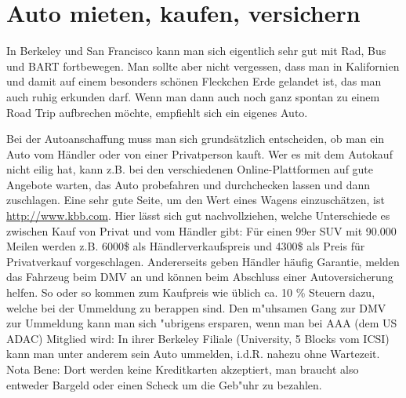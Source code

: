 \documentclass[a4paper]{scrreprt}
\begin{document}
\section{Auto mieten, kaufen, versichern}

In Berkeley und San Francisco kann man sich eigentlich sehr gut mit Rad, Bus und BART fortbewegen. 
Man sollte aber nicht vergessen, dass man in Kalifornien und damit auf einem besonders schönen Fleckchen Erde gelandet ist, das man auch ruhig erkunden darf. 
Wenn man dann auch noch ganz spontan zu einem Road Trip aufbrechen möchte, empfiehlt sich ein eigenes Auto.

Bei der Autoanschaffung muss man sich grundsätzlich entscheiden, ob man ein Auto vom Händler oder von einer Privatperson kauft. 
Wer es mit dem Autokauf nicht eilig hat, kann z.B. bei den verschiedenen Online-Plattformen auf gute Angebote warten, das Auto probefahren und durchchecken lassen und dann zuschlagen. 
Eine sehr gute Seite, um den Wert eines Wagens einzuschätzen, ist \url{http://www.kbb.com}. 
Hier lässt sich gut nachvollziehen, welche Unterschiede es zwischen Kauf von Privat und vom Händler gibt: Für einen 99er SUV mit 90.000 Meilen werden z.B. 6000\$ als Händlerverkaufspreis und 4300\$ als Preis für Privatverkauf vorgeschlagen. 
Andererseits geben Händler häufig Garantie, melden das Fahrzeug beim DMV an und können beim Abschluss einer Autoversicherung helfen. 
So oder so kommen zum Kaufpreis wie üblich ca. 10 \% Steuern dazu, welche bei der Ummeldung zu berappen sind.
Den m"uhsamen Gang zur DMV zur Ummeldung kann man sich "ubrigens ersparen, wenn man bei AAA (dem US ADAC) Mitglied wird: In ihrer Berkeley Filiale (University, 5 Blocks vom ICSI) kann man unter anderem sein Auto ummelden, i.d.R. nahezu ohne Wartezeit.
Nota Bene: Dort werden keine Kreditkarten akzeptiert, man braucht also entweder Bargeld oder einen Scheck um die Geb"uhr zu bezahlen.
\end{document}
